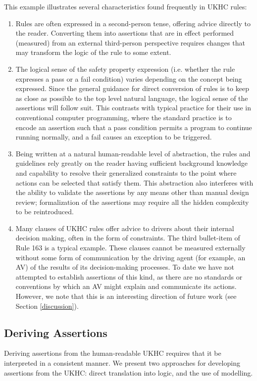 This example illustrates several characteristics found frequently in UKHC rules: %
\begin{enumerate}[i, labelindent=0pt]
\item Rules are often expressed in a second-person tense, offering advice directly to the reader. Converting them into assertions that are in effect performed (measured) from an external third-person perspective requires changes that may transform the logic of the rule to some extent. 
\item The logical sense of the safety property expression (i.e. whether the rule expresses a pass or a fail condition) varies depending on the concept being expressed. Since the general guidance for direct conversion of rules is to keep as close as possible to the top level natural language, the logical sense of the assertions will follow suit. This contrasts with typical practice for their use in conventional computer programming, where the standard practice is to encode an assertion such that a pass condition permits a program to continue running normally, and a fail causes an exception to be triggered.
\item Being written at a natural human-readable level of abstraction, the rules and guidelines rely greatly on the reader having sufficient background knowledge and capability to resolve their generalized constraints to the point where actions can be selected that satisfy them. This abstraction also interferes with the ability to validate the assertions by any means other than manual design review; formalization of the assertions may require all the hidden complexity to be reintroduced. 
\item Many clauses of UKHC rules offer advice to drivers about their internal decision making, often in the form of constraints. The third bullet-item of Rule 163 is a typical example. These clauses cannot be measured externally without some form of communication by the driving agent (for example, an AV) of the results of its decision-making processes. To date we have not attempted to establish assertions of this kind, as there are no standards or conventions by which an AV might explain and communicate its actions. However, we note that this is an interesting direction of future work (see Section \ref{discussion}). 
\end{enumerate}




\subsection{Deriving Assertions}\label{deriving_assertions}
Deriving assertions from the human-readable UKHC %
requires that it be interpreted in a consistent manner. 
We present two approaches %
for developing assertions from the UKHC: direct translation into logic, and the use of modelling.

